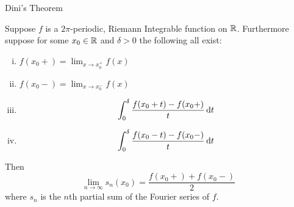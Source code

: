 \begin{section}{Dini's Theorem}

\begin{thrm}[Dini]\label{thrm:Dini}
	Suppose $f$ is a $2\pi$-periodic, Riemann Integrable
	function on $\mathbb{R}$. Furthermore suppose for some $x_0 \in
	\mathbb{R}$ and $\delta > 0$ the following all exist:
		\begin{enumerate}[i)]
			\item
				$f(x_0+) = \lim_{x \rightarrow x_0^+} f(x)$
			\item
				$f(x_0-) = \lim_{x \rightarrow x_0^-} f(x)$
			\item
				\begin{displaymath}
					\int_{0}^{\delta}{\frac{f(x_0+t)-f(x_0+)}{t}}\, \mathrm{d}{t}
				\end{displaymath}
			\item
				\begin{displaymath}
					\int_{0}^{\delta}{\frac{f(x_0-t)-f(x_0-)}{t}}\, \mathrm{d}{t}
				\end{displaymath}
		\end{enumerate}
	Then
		\begin{displaymath}
			\lim_{n \rightarrow \infty} s_n(x_0)
				= \frac{f(x_0+)+f(x_0-)}{2}
		\end{displaymath}
	where $s_n$ is the $n$th partial sum of the Fourier series
	of $f$.
\end{thrm}


\end{section}
